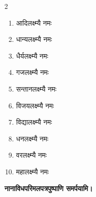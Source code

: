 
\begin{multicols}{2}
\begin{enumerate}
\item आदिलक्ष्म्यै नमः
\item धान्यलक्ष्म्यै नमः
\item धैर्यलक्ष्म्यै नमः
\item गजलक्ष्म्यै नमः
\item सन्तानलक्ष्म्यै नमः
\item विजयलक्ष्म्यै नमः
\item विद्यालक्ष्म्यै नमः
\item धनलक्ष्म्यै नमः
\item वरलक्ष्म्यै नमः
\item महालक्ष्म्यै नमः
\end{enumerate}
\end{multicols}


\begingroup
\centering
\setlength{\columnseprule}{1pt}
\let\chapt\sect


\textbf{\devAya{} नानाविध\-परिमल\-पत्रपुष्पाणि समर्पयामि।}

\endgroup

